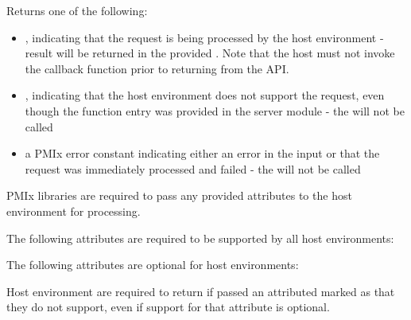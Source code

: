 \begin{arglist}
\end{arglist}

Returns one of the following:

\begin{itemize}
    \item {}, indicating that the request is being processed by the host environment - result will be returned in the provided . Note that the host must not invoke the callback function prior to returning from the \ac{API}.
    \item {}, indicating that the host environment does not support the request, even though the function entry was provided in the server module - the  will not be called
    \item a PMIx error constant indicating either an error in the input or that the request was immediately processed and failed - the  will not be called
\end{itemize}

\reqattrstart
\ac{PMIx} libraries are required to pass any provided attributes to the host environment for processing.

The following attributes are required to be supported by all host environments:


\reqattrend

\optattrstart
The following attributes are optional for host environments:


\optattrend

\advicermstart
Host environment are required to return  if passed an attributed marked as  that they do not support, even if support for that attribute is optional.
\advicermend

